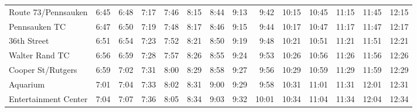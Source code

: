 \begin{center}
\begin{tabular}{@{}lrrrrrrrrrrrrr@{}}
Route 73/Pennsauken & 6:45 & 6:48 & 7:17 & 7:46 & 8:15 & 8:44 & 9:13 & 9:42 & 10:15 & 10:45 & 11:15 & 11:45 & 12:15 \\
Pennsauken TC & 6:47 & 6:50 & 7:19 & 7:48 & 8:17 & 8:46 & 9:15 & 9:44 & 10:17 & 10:47 & 11:17 & 11:47 & 12:17 \\
36th Street & 6:51 & 6:54 & 7:23 & 7:52 & 8:21 & 8:50 & 9:19 & 9:48 & 10:21 & 10:51 & 11:21 & 11:51 & 12:21 \\
Walter Rand TC & 6:56 & 6:59 & 7:28 & 7:57 & 8:26 & 8:55 & 9:24 & 9:53 & 10:26 & 10:56 & 11:26 & 11:56 & 12:26 \\
Cooper St/Rutgers & 6:59 & 7:02 & 7:31 & 8:00 & 8:29 & 8:58 & 9:27 & 9:56 & 10:29 & 10:59 & 11:29 & 11:59 & 12:29 \\
Aquarium & 7:01 & 7:04 & 7:33 & 8:02 & 8:31 & 9:00 & 9:29 & 9:58 & 10:31 & 11:01 & 11:31 & 12:01 & 12:31 \\
Entertainment Center & 7:04 & 7:07 & 7:36 & 8:05 & 8:34 & 9:03 & 9:32 & 10:01 & 10:34 & 11:04 & 11:34 & 12:04 & 12:34 \\
\bottomrule\end{tabular}\end{center}
